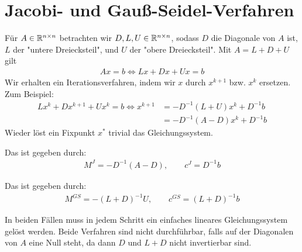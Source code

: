 \documentclass{report}
\begin{document}
	\section{Jacobi- und Gauß-Seidel-Verfahren}
	Für $A \in \mathbb{R}^{n \times n}$ betrachten wir $D,L,U \in \mathbb{R}^{n \times n}$, sodass $D$ die Diagonale von $A$ ist, $L$ der "untere Dreiecksteil", und $U$ der "obere Dreiecksteil". Mit $A = L + D + U$ gilt
	\begin{align*}
		Ax = b \Longleftrightarrow Lx + Dx + Ux = b
	\end{align*}
	Wir erhalten ein Iterationsverfahren, indem wir $x$ durch $x^{k+1}$ bzw. $x^k$ ersetzen. Zum Beispiel:
	\begin{align*}
		Lx^k + Dx^{k+1} + Ux^k = b \Leftrightarrow x^{k+1} &= -D^{-1}(L + U)x^k + D^{-1}b\\
		&= -D^{-1}(A - D)x^k + D^{-1}b
	\end{align*}
	Wieder löst ein Fixpunkt $x^*$ trivial das Gleichungssystem.
	\begin{definition}
		Das  ist gegeben durch:
		\begin{align*}
			M^J = -D^{-1}(A - D),\qquad c^J = D^{-1}b
		\end{align*}
	\end{definition}
	\begin{definition}
		Das  ist gegeben durch:
		\begin{align*}
			M^{GS} = -(L + D)^{-1} U,\qquad c^{GS} = (L + D)^{-1}b
		\end{align*}
	\end{definition}
	In beiden Fällen muss in jedem Schritt ein einfaches lineares Gleichungssystem gelöst werden. Beide Verfahren sind nicht durchführbar, falls auf der Diagonalen von $A$ eine Null steht, da dann $D$ und $L + D$ nicht invertierbar sind.
\end{document}
